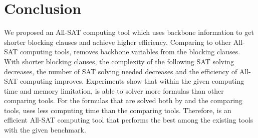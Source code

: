 \section{Conclusion} \label{sec:conc}
We proposed an All-SAT computing tool \tool which uses backbone information to get shorter blocking clauses and achieve higher efficiency.
Comparing to other All-SAT computing tools, \tool removes backbone variables from the blocking clauses. With shorter blocking clauses, the complexity of the following SAT solving decreases, the number of SAT solving needed decreases and the efficiency of All-SAT computing improves. 
Experiments show that within the given computing time and memory limitation, \tool is able to solver more formulas than other comparing tools.
For the formulas that are solved both by \tool and the comparing tools, \tool uses less computing time than the comparing tools.
Therefore, \tool is an efficient All-SAT computing tool that performs the best among the existing tools with the given benchmark.